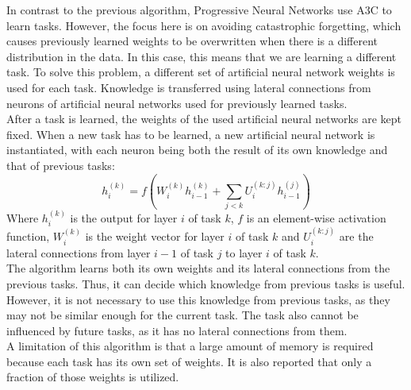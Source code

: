 In contrast to the previous algorithm, Progressive Neural Networks \parencite{Rusu2016} use A3C to learn tasks.
However, the focus here is on avoiding catastrophic forgetting, which causes previously learned weights to be overwritten when there is a different distribution in the data.
In this case, this means that we are learning a different task.
To solve this problem, a different set of artificial neural network weights is used for each task.
Knowledge is transferred using lateral connections from neurons of artificial neural networks used for previously learned tasks.\\
After a task is learned, the weights of the used artificial neural networks are kept fixed.
When a new task has to be learned, a new artificial neural network is instantiated, with each neuron being both the result of its own knowledge and that of previous tasks:
\begin{equation}
    h^{(k)}_i = f \left ( W^{(k)}_i h^{(k)}_{i-1} + \sum_{j<k} U^{(k:j)}_i h^{(j)}_{i-1} \right )
\end{equation}
Where $h^{(k)}_i$ is the output for layer $i$ of task $k$, $f$ is an element-wise activation function, $W^{(k)}_i$ is the weight vector for layer $i$ of task $k$ and $U^{(k:j)}_i$ are the lateral connections from layer $i-1$ of task $j$ to layer $i$ of task $k$.\\
The algorithm learns both its own weights and its lateral connections from the previous tasks.
Thus, it can decide which knowledge from previous tasks is useful.
However, it is not necessary to use this knowledge from previous tasks, as they may not be similar enough for the current task.
The task also cannot be influenced by future tasks, as it has no lateral connections from them.\\
A limitation of this algorithm is that a large amount of memory is required because each task has its own set of weights. It is also reported that only a fraction of those weights is utilized.
